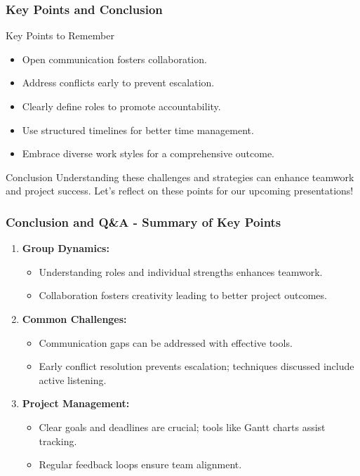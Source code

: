 \documentclass{beamer}
\begin{document}
\begin{frame}[fragile]
    \frametitle{Key Points and Conclusion}
    \begin{block}{Key Points to Remember}
        \begin{itemize}
            \item Open communication fosters collaboration.
            \item Address conflicts early to prevent escalation.
            \item Clearly define roles to promote accountability.
            \item Use structured timelines for better time management.
            \item Embrace diverse work styles for a comprehensive outcome.
        \end{itemize}
    \end{block}
    \begin{block}{Conclusion}
        Understanding these challenges and strategies can enhance teamwork and project success. Let's reflect on these points for our upcoming presentations!
    \end{block}
\end{frame}

\begin{frame}[fragile]
    \frametitle{Conclusion and Q\&A - Summary of Key Points}
    \begin{enumerate}
        \item \textbf{Group Dynamics:}
            \begin{itemize}
                \item Understanding roles and individual strengths enhances teamwork.
                \item Collaboration fosters creativity leading to better project outcomes.
            \end{itemize}

        \item \textbf{Common Challenges:}
            \begin{itemize}
                \item Communication gaps can be addressed with effective tools.
                \item Early conflict resolution prevents escalation; techniques discussed include active listening.
            \end{itemize}

        \item \textbf{Project Management:}
            \begin{itemize}
                \item Clear goals and deadlines are crucial; tools like Gantt charts assist tracking.
                \item Regular feedback loops ensure team alignment.
            \end{itemize}
    \end{enumerate}
\end{frame}
\end{document}
